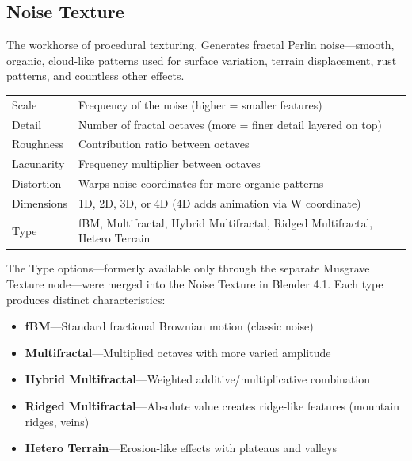 \subsection{Noise Texture}

The workhorse of procedural texturing. Generates fractal Perlin
noise---smooth, organic, cloud-like patterns used for surface
variation, terrain displacement, rust patterns, and countless other
effects.

\begin{center}
\begin{tabularx}{\textwidth}{L{3cm}X}
\toprule
{}
 &  \\
\midrule
Scale & Frequency of the noise (higher = smaller features) \\
Detail & Number of fractal octaves (more = finer detail layered on top) \\
Roughness & Contribution ratio between octaves \\
Lacunarity & Frequency multiplier between octaves \\
Distortion & Warps noise coordinates for more organic patterns \\
Dimensions & 1D, 2D, 3D, or 4D (4D adds animation via W coordinate) \\
Type & fBM, Multifractal, Hybrid Multifractal, Ridged Multifractal, Hetero Terrain \\
\bottomrule
\end{tabularx}
\end{center}

The Type options---formerly available only through the separate
Musgrave Texture node---were merged into the Noise Texture in
Blender 4.1. Each type produces distinct characteristics:

\begin{itemize}[leftmargin=2em]
  \item \textbf{fBM}---Standard fractional Brownian motion (classic noise)
  \item \textbf{Multifractal}---Multiplied octaves with more varied amplitude
  \item \textbf{Hybrid Multifractal}---Weighted additive/multiplicative combination
  \item \textbf{Ridged Multifractal}---Absolute value creates ridge-like features (mountain ridges, veins)
  \item \textbf{Hetero Terrain}---Erosion-like effects with plateaus and valleys
\end{itemize}


